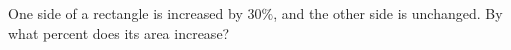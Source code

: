 One side of a rectangle is increased by $30\%$, and the other side is unchanged. By what percent does its area increase?
